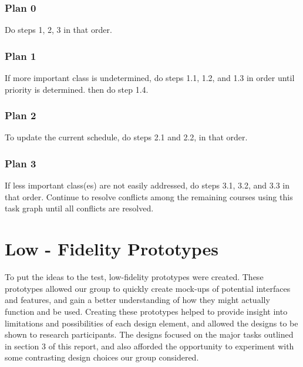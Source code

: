 \documentclass{article}
\begin{document}
\subsubsection{Plan 0}
    Do steps 1, 2, 3 in that order.
\subsubsection{Plan 1}
    If more important class is undetermined, do steps 1.1, 1.2, and 1.3 in order until priority is determined. then do step 1.4.
\subsubsection{Plan 2}
    To update the current schedule, do steps 2.1 and 2.2, in that order.
\subsubsection{Plan 3}
    If less important class(es) are not easily addressed, do steps 3.1, 3.2, and 3.3 in that order. Continue to resolve conflicts among the remaining courses using this task graph until all conflicts are resolved.

\section{Low - Fidelity Prototypes}
To put the ideas to the test, low-fidelity prototypes were created. These prototypes allowed our group to quickly create mock-ups of potential interfaces and features, and gain a better understanding of how they might actually function and be used. Creating these prototypes helped to provide insight into limitations and possibilities of each design element, and allowed the designs to be shown to research participants. The designs focused on the major tasks outlined in section 3 of this report, and also afforded the opportunity to experiment with some contrasting design choices our group considered.

\end{document}

